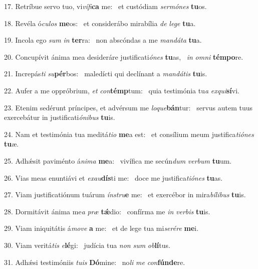 17. Retríbue servo tuo, vi\textit{ví}\textit{fi}\textbf{ca} me: \ast\  et custódiam \textit{ser}\textit{mó}\textit{nes} \textbf{tu}os.\

18. Revéla ó\textit{cu}\textit{los} \textbf{me}os: \ast\  et considerábo mirabília \textit{de} \textit{le}\textit{ge} \textbf{tu}a.\

19. Incola ego \textit{sum} \textit{in} \textbf{ter}ra: \ast\  non abscóndas a me \textit{man}\textit{dá}\textit{ta} \textbf{tu}a.\

20. Concupívit ánima mea desideráre justificati\textit{ó}\textit{nes} \textbf{tu}as, \ast\  \textit{in} \textit{om}\textit{ni} \textbf{tém}\textbf{po}re.\

21. Increpás\textit{ti} \textit{su}\textbf{pér}bos: \ast\  maledícti qui declínant a \textit{man}\textit{dá}\textit{tis} \textbf{tu}is.\

22. Aufer a me oppróbrium, \textit{et} \textit{con}\textbf{témp}tum: \ast\  quia testimónia tu\textit{a} \textit{ex}\textit{qui}\textbf{sí}vi.\

23. Etenim sedérunt príncipes, et advérsum me \textit{lo}\textit{que}\textbf{bán}tur: \ast\  servus autem tuus exercebátur in justificati\textit{ó}\textit{ni}\textit{bus} \textbf{tu}is.\

24. Nam et testimónia tua meditá\textit{ti}\textit{o} \textbf{me}a est: \ast\  et consílium meum justifica\textit{ti}\textit{ó}\textit{nes} \textbf{tu}æ.\

25. Adhǽsit paviménto á\textit{ni}\textit{ma} \textbf{me}a: \ast\  vivífica me secún\textit{dum} \textit{ver}\textit{bum} \textbf{tu}um.\

26. Vias meas enuntiávi et \textit{ex}\textit{au}\textbf{dís}ti me: \ast\  doce me justifica\textit{ti}\textit{ó}\textit{nes} \textbf{tu}as.\

27. Viam justificatiónum tuárum \textit{ín}\textit{stru}\textbf{e} me: \ast\  et exercébor in mira\textit{bí}\textit{li}\textit{bus} \textbf{tu}is.\

28. Dormitávit ánima me\textit{a} \textit{præ} \textbf{tǽ}dio: \ast\  confírma me \textit{in} \textit{ver}\textit{bis} \textbf{tu}is.\

29. Viam iniquitátis á\textit{mo}\textit{ve} \textbf{a} me: \ast\  et de lege tua mi\textit{se}\textit{ré}\textit{re} \textbf{me}i.\

30. Viam veritá\textit{tis} \textit{e}\textbf{lé}gi: \ast\  judícia tua \textit{non} \textit{sum} \textit{ob}\textbf{lí}tus.\

31. Adhǽsi testimóniis \textit{tu}\textit{is} \textbf{Dó}mine: \ast\  no\textit{li} \textit{me} \textit{con}\textbf{fún}\textbf{de}re.\

